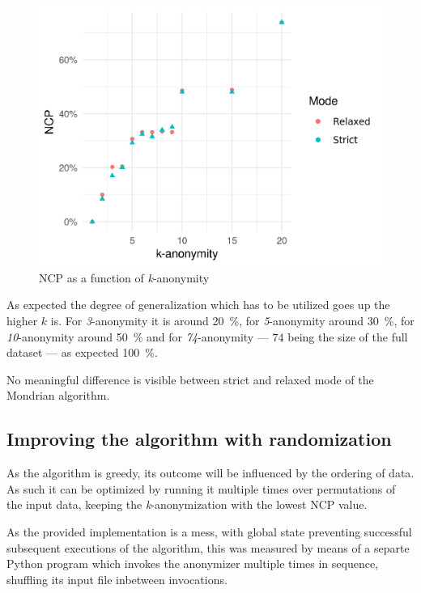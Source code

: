 \documentclass[a4paper]{scrreprt}
\begin{document}
\begin{figure}
		\centering
		\includegraphics[width=\textwidth]{resources/k_anonymity_ncp.png}
		\caption{NCP as a function of \emph{k}-anonymity}
		\label{fig:k_anonymity_ncp}
\end{figure}

As expected the degree of generalization which has to be utilized goes up the
higher $k$ is. For \emph{3}-anonymity it is around \SI{20}{\percent}, for
\emph{5}-anonymity around \SI{30}{\percent}, for \emph{10}-anonymity around
\SI{50}{\percent} and for \emph{74}-anonymity --- $74$ being the size of the
full dataset --- as expected \SI{100}{\percent}.

No meaningful difference is visible between strict and relaxed mode of the
Mondrian algorithm.

\subsection{Improving the algorithm with randomization}

As the algorithm is greedy, its outcome will be influenced by the ordering of
data. As such it can be optimized by running it multiple times over
permutations of the input data, keeping the \emph{k}-anonymization with the
lowest NCP value.

As the provided implementation is a mess, with global state preventing
successful subsequent executions of the algorithm, this was measured by means
of a separte Python program which invokes the anonymizer multiple times in
sequence, shuffling its input file inbetween invocations.
\end{document}
